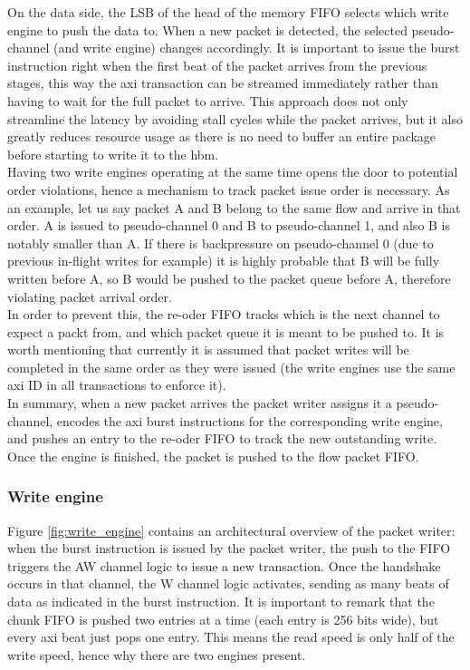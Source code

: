 On the data side, the LSB of the head of the memory FIFO selects which write engine to push the data to. When a new packet is detected, 
the selected pseudo-channel (and write engine) changes accordingly. It is important to issue the burst 
instruction right when the first beat of the packet arrives from the previous stages, this way the \gls{axi} transaction can be streamed immediately 
rather than having to wait for the full packet to arrive. This approach does not only streamline the latency by avoiding stall cycles while the 
packet arrives, but it also greatly reduces resource usage as there is no need to buffer an entire package before starting to write it to the \gls{hbm}.\\

Having two write engines operating at the same time opens the door to potential order violations, hence a mechanism to track packet 
issue order is necessary. As an example, let us say packet A and B belong to the same flow and arrive in that order. A is issued to 
pseudo-channel 0 and B to pseudo-channel 1, and also B is notably smaller than A. If there is backpressure on pseudo-channel 0 
(due to previous in-flight writes for example) it is highly probable that B will be fully written before A, so B would be pushed 
to the packet queue before A, therefore violating packet arrival order. \\

In order to prevent this, the re-oder FIFO tracks which is the next channel to expect a packt from, and which packet queue it is 
meant to be pushed to. It is worth mentioning that currently it is assumed that packet writes will be completed in the same order 
as they were issued (the write engines use the same \gls{axi} ID in all transactions to enforce it). \\

In summary, when a new packet arrives the packet writer assigns it a pseudo-channel, encodes the \gls{axi} burst instructions for the 
corresponding write engine, and pushes an entry to the re-oder FIFO to track the new outstanding write. Once the engine is finished, 
the packet is pushed to the flow packet FIFO. \\

\subsubsection{Write engine}
Figure \ref{fig:write_engine} contains an architectural overview of the packet writer: when the 
burst instruction is issued by the packet writer, the push to the FIFO triggers the AW channel logic to issue a new transaction. Once the handshake 
occurs in that channel, the W channel logic activates, sending as many beats of data as indicated in the burst instruction. It is important to 
remark that the chunk FIFO is pushed two entries at a time (each entry is 256 bits wide), but every \gls{axi} beat just pops one entry. This means the read speed is 
only half of the write speed, hence why there are two engines present. \\

